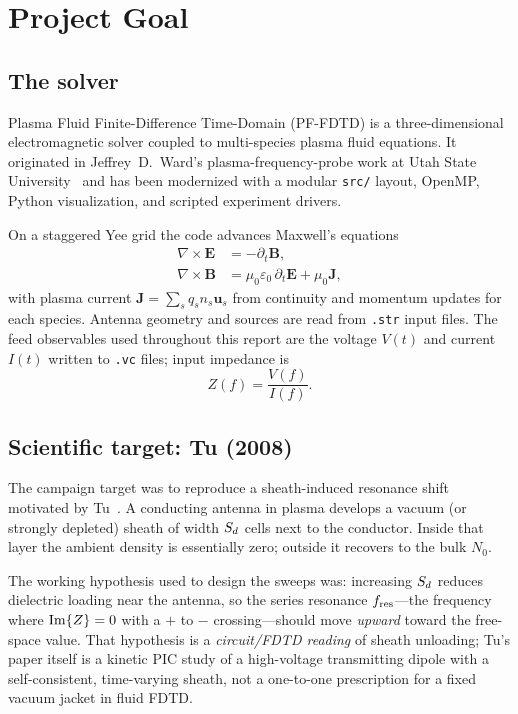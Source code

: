 \chapter{Project Goal}
\label{ch:goals}

\section{The solver}

Plasma Fluid Finite-Difference Time-Domain (PF-FDTD) is a three-dimensional electromagnetic solver coupled to multi-species plasma fluid equations. It originated in Jeffrey~D.\ Ward's plasma-frequency-probe work at Utah State University~\cite{ward2006} and has been modernized with a modular \texttt{src/} layout, OpenMP, Python visualization, and scripted experiment drivers.

On a staggered Yee grid the code advances Maxwell's equations
\begin{align}
\nabla \times \mathbf{E} &= -\partial_t\mathbf{B}, \\
\nabla \times \mathbf{B} &= \mu_0\varepsilon_0\,\partial_t\mathbf{E} + \mu_0\mathbf{J},
\end{align}
with plasma current \(\mathbf{J}=\sum_s q_s n_s\mathbf{u}_s\) from continuity and momentum updates for each species. Antenna geometry and sources are read from \texttt{.str} input files. The feed observables used throughout this report are the voltage \(V(t)\) and current \(I(t)\) written to \texttt{.vc} files; input impedance is
\begin{equation}
Z(f)=\frac{V(f)}{I(f)}.
\end{equation}

\section{Scientific target: Tu (2008)}

The campaign target was to reproduce a sheath-induced resonance shift motivated by Tu~\cite{tu2008}. A conducting antenna in plasma develops a vacuum (or strongly depleted) sheath of width \(S_d\) cells next to the conductor. Inside that layer the ambient density is essentially zero; outside it recovers to the bulk \(N_0\).

The working hypothesis used to design the sweeps was: increasing \(S_d\) reduces dielectric loading near the antenna, so the series resonance \(f_{\mathrm{res}}\)---the frequency where \(\operatorname{Im}\{Z\}=0\) with a \(+\) to \(-\) crossing---should move \emph{upward} toward the free-space value. That hypothesis is a \emph{circuit/FDTD reading} of sheath unloading; Tu's paper itself is a kinetic PIC study of a high-voltage transmitting dipole with a self-consistent, time-varying sheath, not a one-to-one prescription for a fixed vacuum jacket in fluid FDTD.

